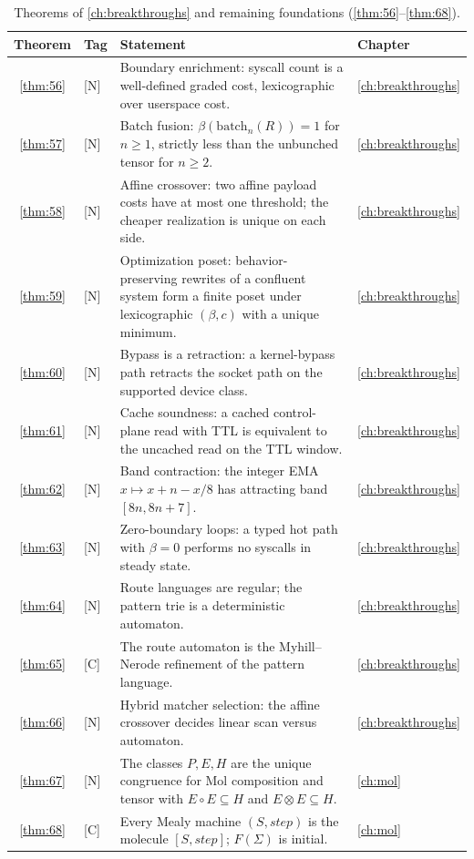 \begin{table}[!htbp]
\centering
\caption{Theorems of \autoref{ch:breakthroughs} and remaining foundations (\autoref{thm:56}--\autoref{thm:68}).}
\label{tab:thm-boundary-class}
\small
\begin{tabular}{@{}clp{7.2cm}l@{}}
\toprule
Theorem & Tag & Statement & Chapter\\
\midrule
\ref{thm:56} & [N] & Boundary enrichment: syscall count is a well-defined graded cost, lexicographic over userspace cost. & \autoref{ch:breakthroughs}\\
\ref{thm:57} & [N] & Batch fusion: $\beta(\mathrm{batch}_n(R))=1$ for $n\ge 1$, strictly less than the unbunched tensor for $n\ge 2$. & \autoref{ch:breakthroughs}\\
\ref{thm:58} & [N] & Affine crossover: two affine payload costs have at most one threshold; the cheaper realization is unique on each side. & \autoref{ch:breakthroughs}\\
\ref{thm:59} & [N] & Optimization poset: behavior-preserving rewrites of a confluent system form a finite poset under lexicographic $(\beta,c)$ with a unique minimum. & \autoref{ch:breakthroughs}\\
\ref{thm:60} & [N] & Bypass is a retraction: a kernel-bypass path retracts the socket path on the supported device class. & \autoref{ch:breakthroughs}\\
\ref{thm:61} & [N] & Cache soundness: a cached control-plane read with TTL is equivalent to the uncached read on the TTL window. & \autoref{ch:breakthroughs}\\
\ref{thm:62} & [N] & Band contraction: the integer EMA $x\mapsto x+n-x/8$ has attracting band $[8n,8n+7]$. & \autoref{ch:breakthroughs}\\
\ref{thm:63} & [N] & Zero-boundary loops: a typed hot path with $\beta=0$ performs no syscalls in steady state. & \autoref{ch:breakthroughs}\\
\ref{thm:64} & [N] & Route languages are regular; the pattern trie is a deterministic automaton. & \autoref{ch:breakthroughs}\\
\ref{thm:65} & [C] & The route automaton is the Myhill--Nerode refinement of the pattern language. & \autoref{ch:breakthroughs}\\
\ref{thm:66} & [N] & Hybrid matcher selection: the affine crossover decides linear scan versus automaton. & \autoref{ch:breakthroughs}\\
\ref{thm:67} & [N] & The classes $P,E,H$ are the unique congruence for Mol composition and tensor with $E \circ E \subseteq H$ and $E \otimes E \subseteq H$. & \autoref{ch:mol}\\
\ref{thm:68} & [C] & Every Mealy machine $(S,\mathit{step})$ is the molecule $[S,\mathit{step}]$; $F(\Sigma)$ is initial. & \autoref{ch:mol}\\
\bottomrule
\end{tabular}
\end{table}


